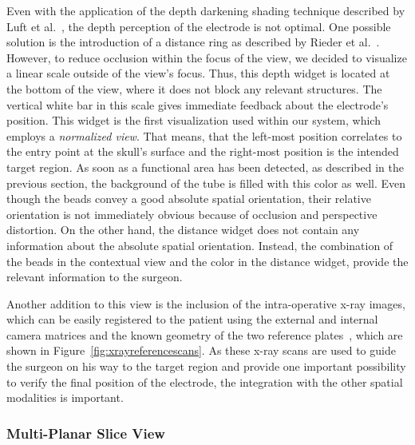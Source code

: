 \documentclass{vgtc}                          %
\begin{document}
Even with the application of the depth darkening shading technique described by Luft et al.~\cite{Luft2005}, the depth perception of the electrode is not optimal. One possible solution is the introduction of a distance ring as described by Rieder et al.~\cite{Rieder2008}. However, to reduce occlusion within the focus of the view, we decided to visualize a linear scale outside of the view's focus. Thus, this depth widget is located at the bottom of the view, where it does not block any relevant structures. The vertical white bar in this scale gives immediate feedback about the electrode's position. This widget is the first visualization used within our system, which employs a \emph{normalized view}. That means, that the left-most position correlates to the entry point at the skull's surface and the right-most position is the intended target region. As soon as a functional area has been detected, as described in the previous section, the background of the tube is filled with this color as well. Even though the beads convey a good absolute spatial orientation, their relative orientation is not immediately obvious because of occlusion and perspective distortion. On the other hand, the distance widget does not contain any information about the absolute spatial orientation. Instead, the combination of the beads in the contextual view and the color in the distance widget, provide the relevant information to the surgeon.

Another addition to this view is the inclusion of the intra-operative x-ray images, which can be easily registered to the patient using the external and internal camera matrices and the known geometry of the two reference plates~\cite{Caprile1990,Zheng2008,Hartley2004}, which are shown in Figure~\ref{fig:xrayreferencescans}. As these x-ray scans are used to guide the surgeon on his way to the target region and provide one important possibility to verify the final position of the electrode, the integration with the other spatial modalities is important.


\subsubsection{Multi-Planar Slice View}\label{sec:overview:recording:mpr}
\end{document}
